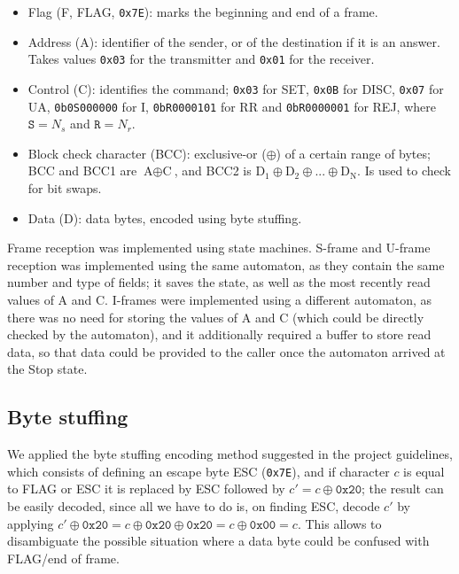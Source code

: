 \documentclass[a4paper, 11pt]{report}
\newcommand*\xor{\oplus}
\begin{document}
\begin{itemize}
	\item Flag (F, FLAG, \texttt{0x7E}): marks the beginning and end of a frame.
	\item Address (A): identifier of the sender, or of the destination if it is an answer. Takes values \texttt{0x03} for the transmitter and \texttt{0x01} for the receiver.
	\item Control (C): identifies the command; \texttt{0x03} for SET, \texttt{0x0B} for DISC, \texttt{0x07} for UA, \texttt{0b0S000000} for I, \texttt{0bR0000101} for RR and \texttt{0bR0000001} for REJ, where $\texttt{S} = N_s$ and $\texttt{R} = N_r$.
	\item Block check character (BCC): exclusive-or ($\xor$) of a certain range of bytes; BCC and BCC1 are $\text{A}\xor\text{C}$, and BCC2 is $\text{D}_1 \xor \text{D}_2 \xor ... \xor \text{D}_\text{N}$. Is used to check for bit swaps.
	\item Data (D): data bytes, encoded using byte stuffing.
\end{itemize}

Frame reception was implemented using state machines. S-frame and U-frame reception was implemented using the same automaton, as they contain the same number and type of fields; it saves the state, as well as the most recently read values of A and C. I-frames were implemented using a different automaton, as there was no need for storing the values of A and C (which could be directly checked by the automaton), and it additionally required a buffer to store read data, so that data could be provided to the caller once the automaton arrived at the Stop state.


\subsection{Byte stuffing}

We applied the byte stuffing encoding method suggested in the project guidelines, which consists of defining an escape byte ESC (\texttt{0x7E}), and if character $c$ is equal to FLAG or ESC it is replaced by ESC followed by $c' = c \xor \texttt{0x20}$; the result can be easily decoded, since all we have to do is, on finding ESC, decode $c'$ by applying $c' \xor \texttt{0x20} = c \xor \texttt{0x20} \xor \texttt{0x20} = c \xor \texttt{0x00} = c$. This allows to disambiguate the possible situation where a data byte could be confused with FLAG/end of frame.
\end{document}
